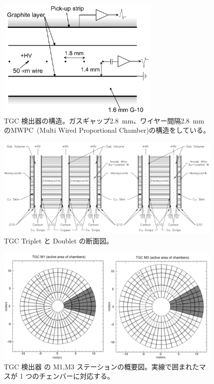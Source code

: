 \begin{figure}[tb]
  \centering
    \includegraphics[clip, width=8cm]{fig/2/TGC_anode_wire.pdf}
  \caption{TGC 検出器の構造\cite{Aad:1129811}。ガスギャップ2.8~mm、ワイヤー間隔2.8~mmのMWPC~(Multi
Wired Proportional Chamber)の構造をしている。}
  \label{fig:MWPC}
\end{figure}

\begin{figure}[tb]
  \centering
  \includegraphics[clip, width=13cm]{fig/2/TGC_construction.pdf}
  \caption{TGC Triplet と Doublet の断面図\cite{Aad:1129811}。}
  \label{fig:TGC}
\end{figure}

\begin{figure}[tb]
  \centering
  \includegraphics[clip, width=14cm]{fig/2/TGC_octant.png}
  \caption{TGC 検出器 の M1,M3 ステーションの概要図\cite{Lellouch:684103}。実線で囲まれたマスが 1 つのチェンバーに対応する。}
  \label{fig:TGC_oc}
\end{figure}

